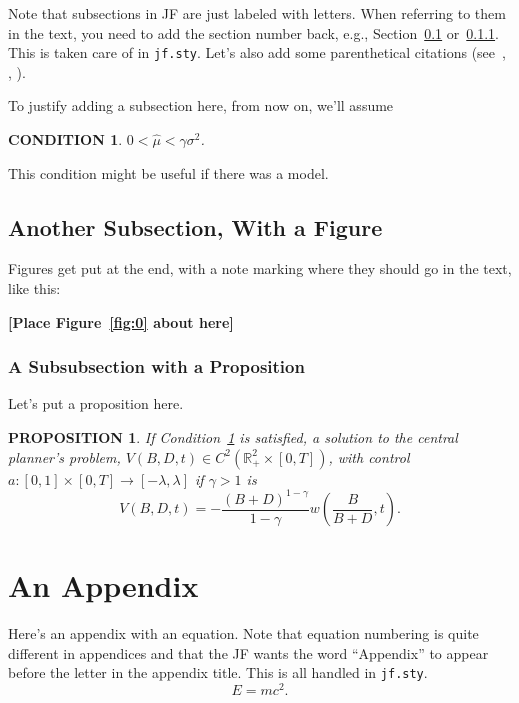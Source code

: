 \documentclass[11pt]{article}
\newtheorem{condition}{CONDITION}
\newtheorem{proposition}{PROPOSITION}
\begin{document}
Note that subsections in JF are just labeled with letters.  When referring to them in the text, you need to add the section number back, e.g., Section~\ref{sec:subsec} or~\ref{sec:subsub}. This is taken care of in \texttt{jf.sty}. Let's also add some parenthetical citations (see~\cite{Stanton:95}, \cite{CarpenterStantonWallace:12}, \cite{Campbell:03}). 

To justify adding a subsection here, from now on, we'll assume
\begin{condition}\label{cond:rates}
$0 <  \hat{\mu} < \gamma\sigma^2$.
\vspace{3mm}
\end{condition}
This condition might be useful if there was a model. 

\subsection{Another Subsection, With a Figure}
\label{sec:subsec}

Figures get put at the end, with a note marking where they should go in the text, like this:

\bigskip
\centerline{\bf [Place Figure~\ref{fig:0} about here]}
\bigskip

\subsubsection{A Subsubsection with a Proposition}
\label{sec:subsub}

Let's put a proposition here.
\begin{proposition} \label{prop:3}
If Condition~\ref{cond:rates} is satisfied,  a solution to the central
planner's problem, $V(B,D,t) \in C^2\left( {\mathbb R}_{+}^2 \times
  [0,T] \right)$, with control $a:[0,1]\times[0,T]\rightarrow [-\lambda,\lambda]$
 if  $\gamma>1$ is
\begin{equation} \label{eq:valuea}
V(B,D,t) =  - \frac{(B+D)^{1-\gamma}}{1-\gamma}   w\left(\frac{B}{B+D},t\right).
\end{equation}
\end{proposition}

\clearpage

\appendix

\section{An Appendix}
\label{sec:app1}

Here's an appendix with an equation. Note that equation numbering is quite different in appendices and that the JF wants the word ``Appendix'' to appear before the letter in the appendix title. This is all handled in \texttt{jf.sty}.
\begin{equation}
  E = mc^2.
\label{eq:eqA}
\end{equation}
\end{document}
